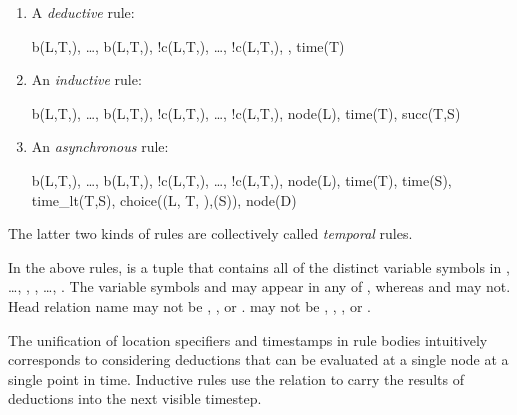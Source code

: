 \begin{enumerate}
\item 
A {\em deductive} rule:

\begin{Drules}
        {b(L,T,), \ldots, b(L,T,), !c(L,T,), \ldots, !c(L,T,), , time(T)}
\end{Drules}
\item 
An {\em inductive} rule:

\begin{Drules}
        {b(L,T,), \ldots, b(L,T,), !c(L,T,), \ldots, !c(L,T,), node(L), time(T), succ(T,S)}
\end{Drules}
\item 
An {\em asynchronous} rule:

\begin{Drules}
        {b(L,T,), \ldots, b(L,T,),
          !c(L,T,), \ldots, !c(L,T,),
          node(L), time(T), time(S), time_lt(T,S), choice((L, T, ),(S)), node(D)}
\end{Drules}
\end{enumerate}
The latter two kinds of rules are collectively called {\em temporal} rules.

In the above rules,  is a tuple that contains all of the distinct variable
symbols in , \ldots, , , \ldots,
.  The variable symbols  and  may appear in
any of , whereas  and  may not.
Head relation name  may not be , , or .
 may not be
, , , or \dedalus{<}.

The unification of location specifiers and timestamps in rule bodies intuitively corresponds to considering deductions that can be evaluated at a single node at a single point in time.  Inductive rules use the  relation to carry the results of deductions into the next visible timestep.

